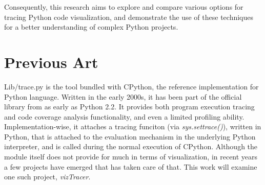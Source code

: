 \documentclass[conference]{IEEEtran}
\begin{document}
Consequently, this research aims to explore and compare various options for tracing Python code visualization, and demonstrate the use of these techniques for a better understanding of complex Python projects.\par

\section{Previous Art} 

Lib/trace.py is the tool bundled with CPython, the reference implementation for Python language\cite{cpythonlibtracepy}. Written in the early 2000s, it has been part of the official library from as early as Python 2.2. It provides both program execution tracing and code coverage analysis functionality, and even a limited profiling ability. Implementation-wise, it attaches a tracing funciton (via \textit{sys.settrace()}), written in Python, that is attached to the evaluation mechanism in the underlying Python interpreter, and is called during the normal execution of CPython\cite{trace}. Although the module itself does not provide for much in terms of visualization, in recent years a few projects have emerged that has taken care of that. This work will examine one such project, \textit{vizTracer}.
\end{document}
